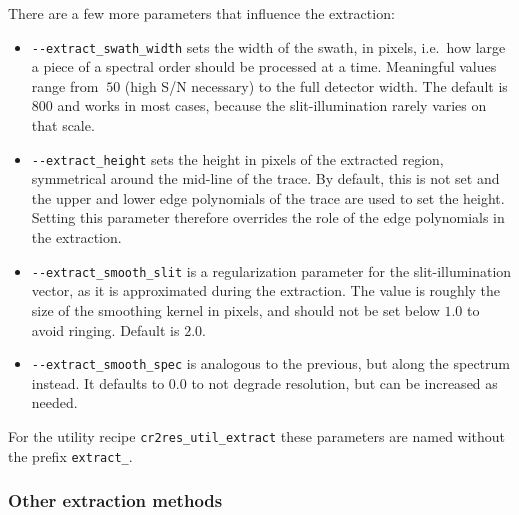 
There are a few more parameters that influence the extraction:
\begin{itemize}
    \item \verb!--extract_swath_width! sets the width of the swath, in pixels,
    i.e.~how large a piece of a spectral order should be processed at a time.
    Meaningful values range from $~50$ (high S/N necessary) to the full detector
    width. The default is $800$ and works in most cases, because the
    slit-illumination rarely varies on that scale.
    \item \verb!--extract_height! sets the height in pixels of the extracted
    region, symmetrical around the mid-line of the trace. By default, this is
    not set and the upper and lower edge polynomials of the trace are used to
    set the height. Setting this parameter therefore overrides the role of the
    edge polynomials in the extraction.
    \item \verb!--extract_smooth_slit! is a regularization parameter for the
    slit-illumination vector, as it is approximated during the extraction. The
    value is roughly the size of the smoothing kernel in pixels, and should not
    be set below $1.0$ to avoid ringing. Default is $2.0$.
    \item \verb!--extract_smooth_spec! is analogous to the previous, but along
    the spectrum instead. It defaults to $0.0$ to not degrade resolution, but
    can be increased as needed.
\end{itemize}

For the utility recipe \verb!cr2res_util_extract! these parameters are named
without the prefix \verb!extract_!.

\subsubsection{Other extraction methods}
\label{sec:otherextr}

